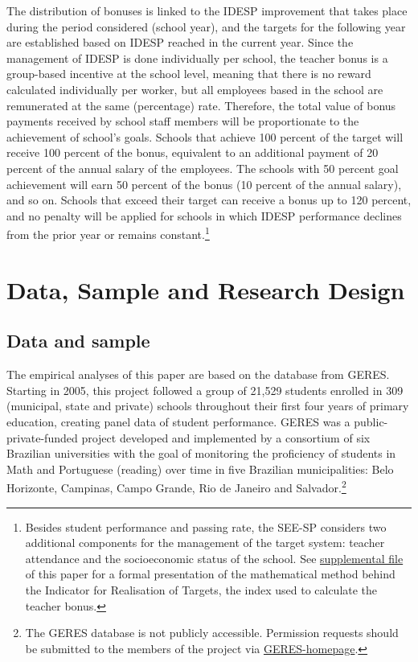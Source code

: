 \documentclass[a4paper, 12pt]{article}
\begin{document}
The distribution of bonuses is linked to the IDESP improvement that takes place during the period considered (school year), and the targets for the following year are established based on IDESP reached in the current year. Since the management of IDESP is done individually per school, the teacher bonus is a group-based incentive at the school level, meaning that there is no reward calculated individually per worker, but all employees based in the school are remunerated at the same (percentage) rate. Therefore, the total value of bonus payments received by school staff members will be proportionate to the achievement of school's goals. Schools that achieve 100 percent of the target will receive 100 percent of the bonus, equivalent to an additional payment of 20 percent of the annual salary of the employees. The schools with 50 percent goal achievement will earn 50 percent of the bonus (10 percent of the annual salary), and so on. Schools that exceed their target can receive a bonus up to 120 percent, and no penalty will be applied for schools in which IDESP performance declines from the prior year or remains constant.\footnote{Besides student performance and passing rate, the SEE-SP considers two additional components for the management of the target system: teacher attendance and the socioeconomic status of the school. See \hyperref[SuppMaterial]{supplemental file} of this paper for a formal presentation of the mathematical method behind the Indicator for Realisation of Targets, the index used to calculate the teacher bonus.}





\section{Data, Sample and Research Design} \label{Paper3-Data}


\subsection{Data and sample} \label{Sample}

The empirical analyses of this paper are based on the database from GERES. Starting in 2005, this project followed a group of 21,529 students enrolled in 309 (municipal, state and private) schools throughout their first four years of primary education, creating panel data of student performance. GERES was a public-private-funded project developed and implemented by a consortium of six Brazilian universities with the goal of monitoring the proficiency of students in Math and Portuguese (reading) over time in five Brazilian municipalities: Belo Horizonte, Campinas, Campo Grande, Rio de Janeiro and Salvador.\footnote{The GERES database is not publicly accessible. Permission requests should be submitted to the members of the project via \href{https://laedpucrio.wordpress.com/projetos/o-projeto-geres/}{GERES-homepage}.}
\end{document}
